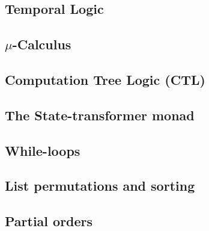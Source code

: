 \subsection{Temporal Logic}
\subsection{$\mu$-Calculus}
\subsection{Computation Tree Logic (CTL)}
\subsection{The State-transformer monad}
\subsection{While-loops}
\subsection{List permutations and sorting}
\subsection{Partial orders}

